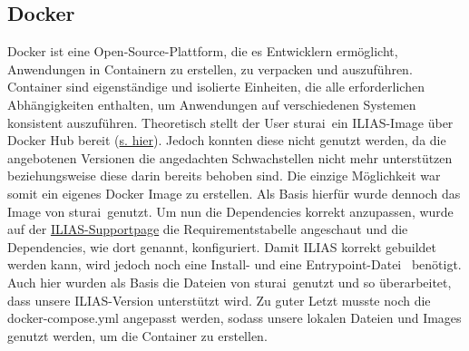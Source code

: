 \documentclass[10pt, a4paper,onecolumn ,titlepage]{article}
\begin{document}
    \subsection{Docker}
    \label{subsec:docker}
    Docker ist eine Open-Source-Plattform, die es Entwicklern ermöglicht, Anwendungen in Containern zu erstellen, zu verpacken und auszuführen.
    Container sind eigenständige und isolierte Einheiten, die alle erforderlichen Abhängigkeiten enthalten, um Anwendungen auf verschiedenen Systemen konsistent auszuführen.\parencite{docker}
    Theoretisch stellt der User \glqq sturai\grqq\ ein ILIAS-Image über Docker Hub bereit (\href{https://hub.docker.com/r/sturai/ilias#!}{s. hier}).
    Jedoch konnten diese nicht genutzt werden, da die angebotenen Versionen die angedachten Schwachstellen nicht mehr unterstützen beziehungsweise diese darin bereits behoben sind.
    Die einzige Möglichkeit war somit ein eigenes Docker Image zu erstellen. Als Basis hierfür wurde dennoch das Image von \glqq sturai\grqq\ genutzt.
    Um nun die Dependencies korrekt anzupassen, wurde auf der \href{https://docu.ilias.de/goto_docu_lm_367.html}{ILIAS-Supportpage} die Requirementstabelle angeschaut und die Dependencies, wie dort genannt, konfiguriert.
    Damit ILIAS korrekt gebuildet werden kann, wird jedoch noch eine Install- und eine Entrypoint-Datei~\parencite{dockerEntrypoints} benötigt.
    Auch hier wurden als Basis die Dateien von \glqq sturai\grqq\ genutzt und so überarbeitet, dass unsere ILIAS-Version unterstützt wird.
    Zu guter Letzt musste noch die docker-compose.yml angepasst werden, sodass unsere lokalen Dateien und Images genutzt werden, um die Container zu erstellen.
\end{document}
